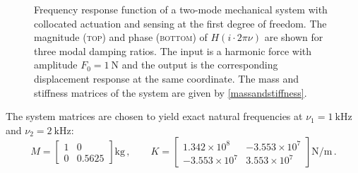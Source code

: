 \documentclass[../Thesis-IJspeert.tex]{subfiles}
\begin{document}
\begin{figure}[t!]
	\caption[Frequency response function of a two-mode mechanical system with collocated actuation and sensing]{Frequency response function of a two-mode mechanical system with collocated actuation and sensing at the first degree of freedom. The magnitude \textsc{(top)} and phase \textsc{(bottom)} of $H(i\cdot 2\pi\nu)$ are shown for three modal damping ratios. The input is a harmonic force with amplitude $F_0=\SI{1}{\newton}$ and the output is the corresponding displacement response at the same coordinate. The mass and stiffness matrices of the system are given by \autoref{massandstiffness}.
	}
	\label{fig:tf_groupplot}
\end{figure}
The system matrices are chosen to yield exact natural frequencies at \(\nu_1 = \SI{1}{\kilo\hertz}\) and \(\nu_2 = \SI{2}{\kilo\hertz}\):
\begin{equation}
\label{massandstiffness}
M = \begin{bmatrix} 1 & 0 \\ 0 & 0.5625 \end{bmatrix}  \si{\kilogram}\,, \qquad
K = \begin{bmatrix} 1.342 \times 10^{8} & -3.553 \times 10^{7} \\ -3.553 \times 10^{7} & 3.553 \times 10^{7} \end{bmatrix} \si{\newton\per\meter}\,. 
\end{equation}
\end{document}
